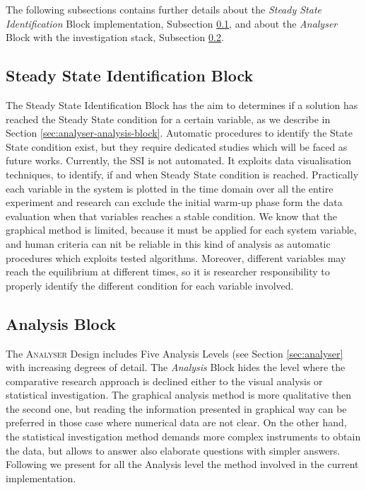 The following subsections contains further details about the \textit{Steady State Identification} Block implementation, Subsection \ref{sec:analyser-impl-ss-block}, and about the \textit{Analyser} Block with the investigation stack, Subsection \ref{sec:analyser-impl-analysis-block}.

\subsection{Steady State Identification Block}\label{sec:analyser-impl-ss-block}

The Steady State Identification Block has the aim to  determines if a solution has reached the Steady State condition for a certain variable, as we describe in Section \ref{sec:analyser-analysis-block}. Automatic procedures to identify the State State condition exist, but they require dedicated studies which will be faced as future works. Currently, the SSI is not automated. It exploits data visualisation techniques, to identify, if and when Steady State condition is reached. Practically each variable in the system is plotted in the time domain over all the entire experiment and research can exclude  the initial warm-up phase form the data evaluation when that variables reaches a stable condition. 
We know that the graphical method is limited, because it must be applied for each system variable, and human criteria can nit be reliable in this kind of analysis as automatic procedures which exploits tested algorithms. Moreover, different variables may reach the equilibrium at different times, so it is researcher responsibility to properly identify the different condition for each variable involved.

\subsection{Analysis Block}\label{sec:analyser-impl-analysis-block}

The \textsc{Analyser} Design includes Five Analysis Levels (see Section \ref{sec:analyser} with increasing degrees of detail. The \textit{Analysis} Block hides the level where the comparative research approach is declined either to the visual analysis or statistical investigation. The graphical analysis method is more qualitative then the second one, but reading the information presented in graphical way can be preferred in those case where numerical data are not clear. On the other hand, the statistical investigation method demands more complex instruments to obtain the data, but allows to answer also elaborate questions with simpler answers. Following we present for all the Analysis level the method involved in the current implementation.

